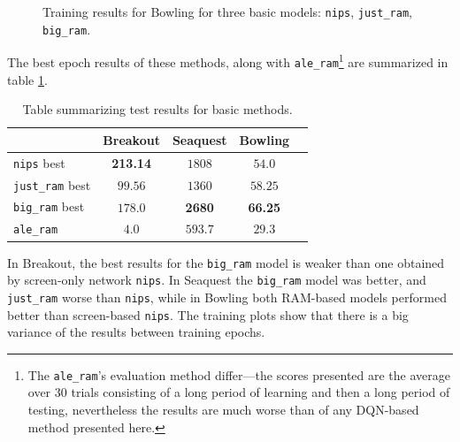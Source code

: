 \begin{figure}[h]
\centering
{}
\caption{Training results for Bowling  for three basic models: \texttt{nips}, \texttt{just\_ram}, \texttt{big\_ram}.}
\label{fig:bowling-plain}
\end{figure}

The best epoch results of these methods, along with \texttt{ale\_ram}\footnote{The \texttt{ale\_ram}'s evaluation method differ---the scores presented are the average over $30$ trials consisting of a long period of learning and then a long period of testing, nevertheless the results are much worse than of any DQN-based method presented here.} are summarized in table \ref{table:results-plain}.
\begin{table}[h]
\centering
  \begin{tabular}{X c c c c}
  \toprule
  & Breakout & Seaquest & Bowling  \\
  \midrule
  \texttt{nips} best & \textbf{213.14}  & $1808$  & $54.0$  \\
  \texttt{just\_ram} best & $99.56$ & $1360$ & $58.25$  \\
  \texttt{big\_ram} best & $178.0$ & \textbf{2680} & \textbf{66.25} \\
  \texttt{ale\_ram} & $4.0$ & $593.7$ & $29.3$ \\
  \bottomrule
  \end{tabular}
\caption{Table summarizing test results for basic methods.}
\label{table:results-plain}
\end{table}

In Breakout, the best results for the \texttt{big\_ram} model is weaker than one obtained by screen-only network \texttt{nips}. In Seaquest the \texttt{big\_ram} model was better, and \texttt{just\_ram} worse than \texttt{nips}, while in Bowling both RAM-based models performed better than screen-based \texttt{nips}.
The training plots show that there is a big variance of the results between training epochs.

